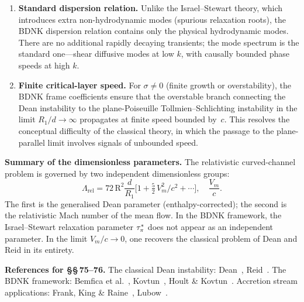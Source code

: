 \begin{enumerate}
\item \textbf{Standard dispersion relation.}  Unlike the Israel--Stewart
  theory, which introduces extra non-hydrodynamic modes (spurious
  relaxation roots), the BDNK dispersion relation contains only the
  physical hydrodynamic modes.  There are no additional rapidly decaying
  transients; the mode spectrum is the standard one---shear diffusive
  modes at low $k$, with causally bounded phase speeds at high $k$.

\item \textbf{Finite critical-layer speed.}  For $\sigma \neq 0$
  (finite growth or overstability), the BDNK frame coefficients
  ensure that the overstable branch connecting the Dean instability to
  the plane-Poiseuille Tollmien--Schlichting instability in the limit
  $R_1/d \to \infty$ propagates at finite speed bounded by~$c$.
  This resolves the conceptual difficulty of the classical theory, in
  which the passage to the plane-parallel limit involves signals of
  unbounded speed.
\end{enumerate}

\medskip
\noindent\textbf{Summary of the dimensionless parameters.}
The relativistic curved-channel problem is governed by two independent
dimensionless groups:
\begin{equation}
\label{eq:rel-8-params}
\Lambda_{\mathrm{rel}}
  = 72\,\mathrm{R}^2\frac{d}{R_1}
  \bigl[1 + \tfrac{5}{2}\,V_m^2/c^2 + \cdots\bigr],
\quad
\frac{V_m}{c}.
\end{equation}
The first is the generalised Dean parameter (enthalpy-corrected);
the second is the relativistic Mach number of the mean flow.
In the BDNK framework, the Israel--Stewart relaxation parameter
$\tau_{\pi}^*$ does not appear as an independent parameter.
In the limit $V_m/c \to 0$,
one recovers the classical problem of Dean and Reid in its entirety.

\medskip
\noindent\textbf{References for \S\S\,75--76.}
The classical Dean instability: Dean~\cite{Dean1928}, Reid~\cite{Reid1958}.
The BDNK framework: Bemfica et al.~\cite{BemficaDN2018},
Kovtun~\cite{Kovtun2019}, Hoult \& Kovtun~\cite{HoultKovtun2020}.
Accretion stream applications: Frank, King \& Raine~\cite{FrankKingRaine2002},
Lubow~\cite{Lubow1989}.
